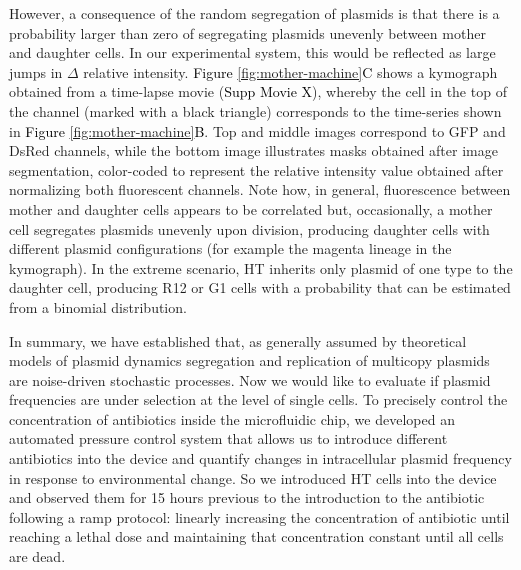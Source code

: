 \documentclass[fleqn,12pt]{wlscirep}
\newcommand{\fig}[1]{\textcolor{black}{#1}}
\begin{document}
However, a consequence of the random segregation of plasmids is that there is a probability larger than zero of segregating plasmids unevenly between mother and daughter cells. In our experimental system, this would be reflected as large jumps in $\Delta$ relative intensity.  \fig{Figure \ref{fig:mother-machine}C} shows a kymograph obtained from a time-lapse movie (\fig{Supp Movie X}), whereby the cell in the top of the channel (marked with a black triangle) corresponds to the time-series shown in \fig{Figure \ref{fig:mother-machine}B}.  Top and middle images correspond to GFP and DsRed channels, while the bottom image illustrates masks obtained after image segmentation, color-coded to represent the relative intensity value obtained after normalizing both fluorescent channels.  Note how, in general, fluorescence between mother and daughter cells appears to be correlated but, occasionally, a mother cell segregates plasmids unevenly upon division, producing daughter cells with different plasmid configurations (for example the magenta lineage in the kymograph). In the extreme scenario, HT inherits only plasmid of one type to the daughter cell, producing R12 or G1 cells with a probability that can be estimated from a binomial distribution. 

In summary, we have established that, as generally assumed by theoretical models of plasmid dynamics \cite{Ilhan2019,santer2019evolutionary,SanMillan2014,Rodriguez2018} segregation and replication of multicopy plasmids are noise-driven stochastic processes. Now we would like to evaluate if plasmid frequencies are under selection at the level of single cells.
To precisely control the concentration of antibiotics inside the microfluidic chip, we developed an automated pressure control system\cite{Ferry2011} that allows us to introduce different antibiotics into the device and quantify changes in intracellular plasmid frequency in response to environmental change.
So we introduced HT cells into the device and observed them for 15 hours previous to the introduction to the antibiotic following a ramp protocol: linearly increasing the concentration of antibiotic until reaching a lethal dose and maintaining that concentration constant until all cells are dead. 
\end{document}
